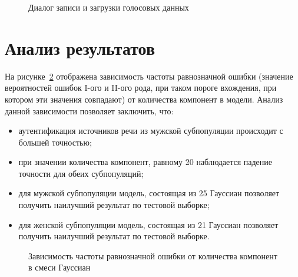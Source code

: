\begin{figure}[ht!]
\caption{Диалог записи и загрузки голосовых данных}
\label{fig:ui:voice_upload}
\end{figure}

\section{Анализ результатов}

На рисунке~\ref{fig:eer_from_k} отображена зависимость частоты равнозначной ошибки (значение вероятностей ошибок I-ого и II-ого рода, при таком пороге вхождения, при котором эти значения совпадают) от количества компонент в модели. Анализ данной зависимости позволяет заключить, что:
\begin{itemize}
\item аутентификация источников речи из мужской субпопуляции происходит с большей точностью;
\item при значении количества компонент, равному 20 наблюдается падение точности для обеих субпопуляций;
\item для мужской субпопуляции модель, состоящая из 25 Гауссиан позволяет получить наилучший результат по тестовой выборке;
\item для женской субпопуляции модель, состоящая из 21 Гауссиан позволяет получить наилучший результат по тестовой выборке.
\end{itemize}

\begin{figure}[ht!]
\caption{Зависимость частоты равнозначной ошибки от количества компонент в смеси Гауссиан}
\label{fig:eer_from_k}
\end{figure}

